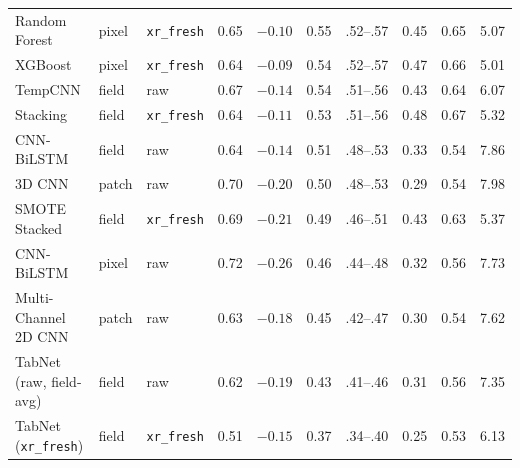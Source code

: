 \documentclass[preprint,authoryear]{elsarticle}
\begin{document}
\begin{longtable}{lllccccccc}
Random Forest         & pixel & \texttt{xr\_fresh} & 0.65 & $-0.10$ & 0.55 & .52--.57 & 0.45 & 0.65 & 5.07 \\
XGBoost               & pixel & \texttt{xr\_fresh} & 0.64 & $-0.09$ & 0.54 & .52--.57 & 0.47 & 0.66 & 5.01 \\
TempCNN               & field & raw & 0.67 & $-0.14$ & 0.54 & .51--.56 & 0.43 & 0.64 & 6.07 \\
Stacking              & field & \texttt{xr\_fresh} & 0.64 & $-0.11$ & 0.53 & .51--.56 & 0.48 & 0.67 & 5.32 \\
CNN-BiLSTM            & field & raw & 0.64 & $-0.14$ & 0.51 & .48--.53 & 0.33 & 0.54 & 7.86 \\
3D CNN                & patch & raw & 0.70 & $-0.20$ & 0.50 & .48--.53 & 0.29 & 0.54 & 7.98 \\
SMOTE Stacked         & field & \texttt{xr\_fresh} & 0.69 & $-0.21$ & 0.49 & .46--.51 & 0.43 & 0.63 & 5.37 \\
CNN-BiLSTM            & pixel & raw & 0.72 & $-0.26$ & 0.46 & .44--.48 & 0.32 & 0.56 & 7.73 \\
Multi-Channel 2D CNN  & patch & raw & 0.63 & $-0.18$ & 0.45 & .42--.47 & 0.30 & 0.54 & 7.62 \\
TabNet (raw, field-avg) & field & raw & 0.62 & $-0.19$ & 0.43 & .41--.46 & 0.31 & 0.56 & 7.35 \\
TabNet (\texttt{xr\_fresh}) & field & \texttt{xr\_fresh} & 0.51 & $-0.15$ & 0.37 & .34--.40 & 0.25 & 0.53 & 6.13 \\
\end{longtable}
\vspace{-6pt}
\endgroup
\end{document}
